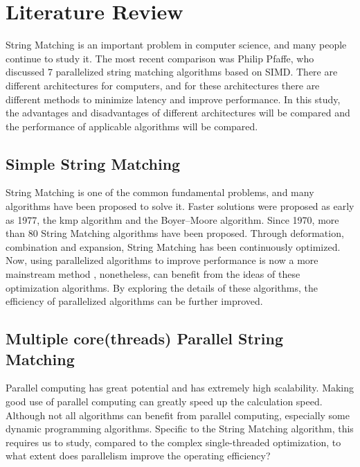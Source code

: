 \documentclass[11pt]{article}       %
\begin{document}
\section{Literature Review} \label{litrev}


String Matching is an important problem in computer science, and many people continue to study it. The most recent comparison was Philip Pfaffe, who discussed 7 parallelized string matching algorithms based on SIMD. There are different architectures for computers, and for these architectures there are different methods to minimize latency and improve performance. In this study, the advantages and disadvantages of different architectures will be compared and the performance of applicable algorithms will be compared. \\

\subsection{Simple String Matching}\label{Simple}
String Matching is one of the common fundamental problems, and many algorithms have been proposed to solve it. Faster solutions were proposed as early as 1977, the kmp algorithm and the Boyer–Moore algorithm\cite{Matching}. Since 1970, more than 80 String Matching algorithms have been proposed. Through deformation, combination and expansion, String Matching has been continuously optimized. Now, using parallelized algorithms to improve performance is now a more mainstream method\cite{Matching} , nonetheless, can benefit from the ideas of these optimization algorithms. By exploring the details of these algorithms, the efficiency of parallelized algorithms can be further improved. \\

\subsection{Multiple core(threads) Parallel String Matching}\label{Multiple}
Parallel computing has great potential and has extremely high scalability. Making good use of parallel computing can greatly speed up the calculation speed. Although not all algorithms can benefit from parallel computing, especially some dynamic programming algorithms. Specific to the String Matching algorithm, this requires us to study, compared to the complex single-threaded optimization, to what extent does parallelism improve the operating efficiency? \\
\end{document}

